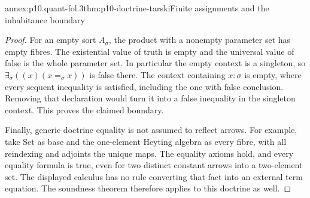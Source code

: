 \begin{annexitem}{annex:p10.quant-fol.3}{thm:p10-doctrine-tarski}{Finite assignments and the inhabitance boundary}
\begin{proof}
For an empty sort \(A_\sigma\), the product with a nonempty parameter
set has empty fibres. The existential value of truth is empty and
the universal value of false is the whole parameter set.
In particular the empty context is a singleton, so
\(\exists_\sigma((x)(x=_\sigma x))\) is false there.
The context containing \(x:\sigma\) is empty, where every sequent
inequality is satisfied, including the one with false conclusion.
Removing that declaration would turn it into a false inequality in
the singleton context. This proves the claimed boundary.

Finally, generic doctrine equality is not assumed to reflect arrows.
For example, take Set as base and the one-element Heyting algebra
as every fibre, with all reindexing and adjoints the unique maps.
The equality axioms hold, and every equality formula is true, even
for two distinct constant arrows into a two-element set.
The displayed calculus has no rule converting that fact into an
external term equation. The soundness theorem therefore applies to
this doctrine as well.
\end{proof}
\end{annexitem}

